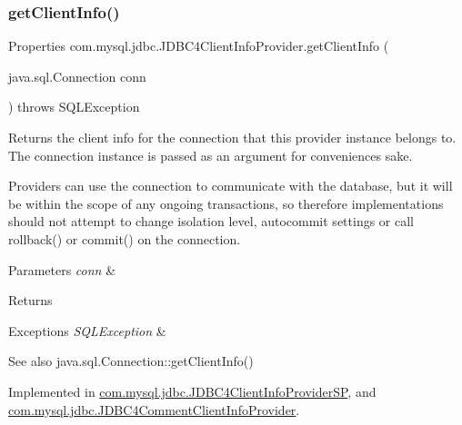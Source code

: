 \subsubsection{\texorpdfstring{get\+Client\+Info()}{getClientInfo()}\hspace{0.1cm}{\footnotesize\ttfamily [1/2]}}
{\footnotesize\ttfamily Properties com.\+mysql.\+jdbc.\+J\+D\+B\+C4\+Client\+Info\+Provider.\+get\+Client\+Info (\begin{DoxyParamCaption}\item[{java.\+sql.\+Connection}]{conn }\end{DoxyParamCaption}) throws S\+Q\+L\+Exception}

Returns the client info for the connection that this provider instance belongs to. The connection instance is passed as an argument for convenience\textquotesingle{}s sake.

Providers can use the connection to communicate with the database, but it will be within the scope of any ongoing transactions, so therefore implementations should not attempt to change isolation level, autocommit settings or call rollback() or commit() on the connection.


\begin{DoxyParams}{Parameters}
{\em conn} & \\
\hline
\end{DoxyParams}
\begin{DoxyReturn}{Returns}

\end{DoxyReturn}

\begin{DoxyExceptions}{Exceptions}
{\em S\+Q\+L\+Exception} & \\
\hline
\end{DoxyExceptions}
\begin{DoxySeeAlso}{See also}
java.\+sql.\+Connection\+::get\+Client\+Info() 
\end{DoxySeeAlso}


Implemented in \mbox{\hyperlink{classcom_1_1mysql_1_1jdbc_1_1_j_d_b_c4_client_info_provider_s_p_a75c1a50050648fcab79401cd73342756}{com.\+mysql.\+jdbc.\+J\+D\+B\+C4\+Client\+Info\+Provider\+SP}}, and \mbox{\hyperlink{classcom_1_1mysql_1_1jdbc_1_1_j_d_b_c4_comment_client_info_provider_a1b7fb984a52c404502cb78bc07673e3a}{com.\+mysql.\+jdbc.\+J\+D\+B\+C4\+Comment\+Client\+Info\+Provider}}.

\mbox{\label{interfacecom_1_1mysql_1_1jdbc_1_1_j_d_b_c4_client_info_provider_ab96958315c2fc129db072cfca9bd9547}} 
